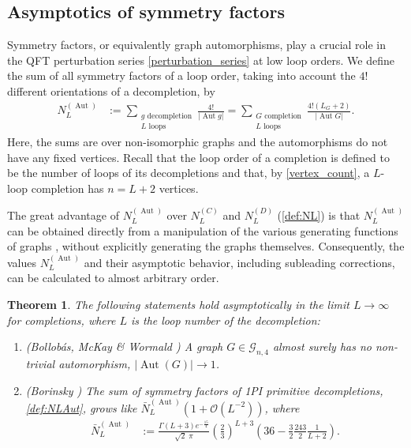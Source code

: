 \documentclass[11pt,a4paper]{article}
\newtheorem{theorem}{Theorem}
\newcommand{\abs}[1]{\lvert #1 \rvert}
\newcommand{\Aut}{\operatorname{Aut}}
\renewcommand{\|}{\rule[-0.4ex]{0.2ex}{1.2em}}
\begin{document}
\subsection{Asymptotics of symmetry factors}\label{sec:asymptotics_symmetry}





Symmetry factors, or equivalently graph automorphisms, play a crucial role in the  QFT perturbation series \cref{perturbation_series} at low loop orders. 
 We define the sum of all symmetry factors of a loop order, taking into account the $4!$ different orientations of a decompletion, by
\begin{align}\label{def:NLAut}
	N^{(\Aut)}_L &:= \sum_{\substack{g \text{ decompletion}\\{L \text{ loops}}}} \frac{4!}{\abs{\Aut g}}= \sum_{ \substack{G \text{ completion}\\  L \text{ loops}}} \frac{4! \left( L_G+2 \right)  }{\abs{\Aut G}}.
\end{align}
Here, the sums are over non-isomorphic graphs and the automorphisms do not have any fixed vertices. Recall  that the loop order of a completion is defined to be the number of loops of its decompletions   and that, by \cref{vertex_count}, a $L$-loop completion has $n=L+2$ vertices.

The great advantage of $N^{(\Aut)}_L$ over $N^{(C)}_L$ and $N^{(D)}_L$ (\cref{def:NL}) is that $N^{(\Aut)}_L$ can be obtained directly from a manipulation of the various generating functions of graphs  \cite{cvitanovic_number_1978,borinsky_renormalized_2017}, without explicitly generating the graphs themselves. Consequently, the values $N^{(\Aut)}_L$ and their asymptotic behavior, including subleading corrections, can be calculated to almost arbitrary order.


\begin{theorem}\label{thm:asymptotic_symmetry_factor}
	The following statements hold asymptotically in the limit $L\rightarrow \infty$ for completions, where $L$ is the loop number of the decompletion:
	\begin{enumerate}
		\item (Bollobás, McKay \& Wormald \cite{bollobas_asymptotic_1982,mckay_automorphisms_1984}) A graph $G\in \mathcal{G}_{n,4}$ almost surely has no non-trivial automorphism, $\abs{\Aut(G)}\rightarrow 1$.
		\item (Borinsky \cite{borinsky_renormalized_2017}) The sum of symmetry factors of  1PI primitive decompletions, \cref{def:NLAut},  grows like $\bar N^{(\Aut)}_L \left( 1+ \mathcal{O}\left( L^{-2}  \right)   \right)$, where
		\begin{align*} 
		  \bar N^{(\Aut)}_L &:=\frac{\Gamma(L+3) e^{-\frac{15}{4}}}{\sqrt 2 \; \pi} \left( \frac 2 3  \right) ^{L+3} \left( 36 - \frac 32 \frac{243}{2}\frac{1}{L+2} \right) .
		\end{align*}
	\end{enumerate}
\end{theorem}
\end{document}
